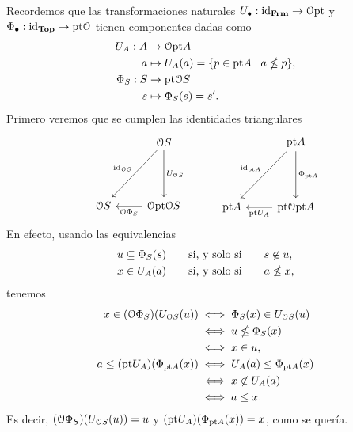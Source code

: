 \documentclass{comunicaciones}
\begin{document}
Recordemos que las transformaciones naturales
$U_\bullet:\mathrm{id}_{\mathbf{Frm}}\to\mathcal{O}\mathrm{pt}$ y
$\Phi_\bullet:\mathrm{id}_{\mathbf{Top}}\to\mathrm{pt}\mathcal{O}$
tienen componentes dadas como
\begin{align*}
    U_A:A&\to \mathcal{O}\mathrm{pt} A \\
    a &\mapsto U_A(a) = \{p\in \mathrm{pt} A \mid a\nleq p\}, \\
    \Phi_S:S&\to \mathrm{pt}\mathcal{O} S \\
    s &\mapsto \Phi_S(s)=\overline{s}'.
\end{align*}
Primero veremos que se cumplen las identidades triangulares
\[
    \begin{tikzcd}[row sep=15mm]
        & \Cal OS \ar[d,"U_{\Cal OS}"] \ar[dl,"\id_{\Cal OS}"']
        \\
        \Cal OS
        & \Cal O\pt\Cal OS \ar[l,"\Cal O\Phi_S"]
    \end{tikzcd}
    \hspace{10mm}
    \begin{tikzcd}[row sep=15mm]
        & \pt A \ar[d,"\Phi_{\pt A}"] \ar[dl,"\id_{\pt A}"']
        \\
        \pt A
        & \pt \Cal O\pt A \ar[l,"\pt U_A"]
    \end{tikzcd}
\]
En efecto, usando las equivalencias
\begin{align*}
    u\subseteq \Phi_S(s) &\qquad\text{si, y solo si}\qquad s\not\in u, \\
    x\in U_A(a) &\qquad\text{si, y solo si}\qquad a\nleq x,
\end{align*}
tenemos
\begin{align*}
    x\in (\mathcal{O}\Phi_S)(U_{\mathcal{O}S}(u))
    &\iff \Phi_S(x) \in U_{\mathcal{O}S}(u) \\
    &\iff u\nleq \Phi_S(x) \\
    &\iff x\in u,
    \\
    a\leq (\mathrm{pt} U_A)(\Phi_{\mathrm{pt} A}(x))
    &\iff U_A(a) \leq \Phi_{\mathrm{pt} A}(x) \\
    &\iff x\not\in U_A(a) \\
    &\iff a\leq x.
\end{align*}
Es decir, $(\mathcal{O}\Phi_S)(U_{\mathcal{O}S}(u))=u$
y $(\mathrm{pt} U_A)(\Phi_{\mathrm{pt} A}(x))=x$, como se quería.
\end{document}
